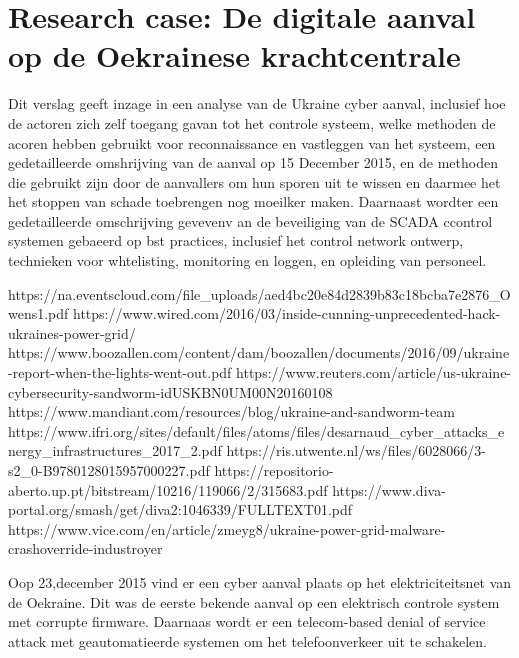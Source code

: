 	\section{Research case: De digitale aanval op de Oekrainese krachtcentrale}
Dit verslag geeft inzage in een analyse van de Ukraine cyber aanval,
inclusief hoe de actoren zich zelf toegang gavan tot het controle systeem, welke methoden de acoren hebben gebruikt voor reconnaissance en vastleggen van het systeem, een gedetailleerde omshrijving van de aanval op 15 December 2015, en de methoden die gebruikt zijn door de aanvallers om hun sporen uit te wissen en daarmee het het stoppen van schade toebrengen  nog moeilker maken. Daarnaast wordter  een gedetailleerde omschrijving gevevenv an de beveiliging van de SCADA ccontrol systemen gebaeerd op bst practices, inclusief het control network ontwerp, technieken voor whtelisting, monitoring en loggen, en  opleiding van personeel.

https://na.eventscloud.com/file_uploads/aed4bc20e84d2839b83c18bcba7e2876_Owens1.pdf
\cite{Whitehead2017ukrainepoweroutage}
https://www.wired.com/2016/03/inside-cunning-unprecedented-hack-ukraines-power-grid/
\cite{zetter2016GridHack}
https://www.boozallen.com/content/dam/boozallen/documents/2016/09/ukraine-report-when-the-lights-went-out.pdf
\cite{boozallen2016lightwentout}
https://www.reuters.com/article/us-ukraine-cybersecurity-sandworm-idUSKBN0UM00N20160108
\cite{finklejan2016UsBlamesRussianSandworm}
https://www.mandiant.com/resources/blog/ukraine-and-sandworm-team
\cite{}
https://www.ifri.org/sites/default/files/atoms/files/desarnaud_cyber_attacks_energy_infrastructures_2017_2.pdf
\cite{desarnaud2017cyberattacks}
https://ris.utwente.nl/ws/files/6028066/3-s2_0-B9780128015957000227.pdf
\cite{caseli04112016intrusiondetectioncontrolsystem}
https://repositorio-aberto.up.pt/bitstream/10216/119066/2/315683.pdf
\cite{rochascadatesting}
https://www.diva-portal.org/smash/get/diva2:1046339/FULLTEXT01.pdf
\cite{hidajat2016ScadaSimulator}
https://www.vice.com/en/article/zmeyg8/ukraine-power-grid-malware-crashoverride-industroyer
\cite{zetter2017moreDangerousMalware}


Oop 23,december 2015  vind er een cyber aanval plaats op het elektriciteitsnet van de Oekraine. Dit was de eerste bekende aanval op een elektrisch controle  system met corrupte firmware. Daarnaas wordt er een telecom-based denial of service attack met  geautomatieerde systemen om het telefoonverkeer uit te schakelen.
\cite{Whitehead2017ukrainepoweroutage}

